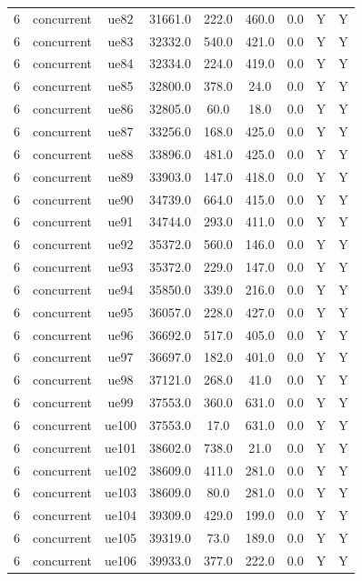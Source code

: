 \begin{table}[ht]
\begin{tabular}{|c|c|c|c|c|c|c|c|c|}
6 & concurrent & ue82 & 31661.0 & 222.0 & 460.0 & 0.0 & Y & Y \\
6 & concurrent & ue83 & 32332.0 & 540.0 & 421.0 & 0.0 & Y & Y \\
6 & concurrent & ue84 & 32334.0 & 224.0 & 419.0 & 0.0 & Y & Y \\
6 & concurrent & ue85 & 32800.0 & 378.0 & 24.0 & 0.0 & Y & Y \\
6 & concurrent & ue86 & 32805.0 & 60.0 & 18.0 & 0.0 & Y & Y \\
6 & concurrent & ue87 & 33256.0 & 168.0 & 425.0 & 0.0 & Y & Y \\
6 & concurrent & ue88 & 33896.0 & 481.0 & 425.0 & 0.0 & Y & Y \\
6 & concurrent & ue89 & 33903.0 & 147.0 & 418.0 & 0.0 & Y & Y \\
6 & concurrent & ue90 & 34739.0 & 664.0 & 415.0 & 0.0 & Y & Y \\
6 & concurrent & ue91 & 34744.0 & 293.0 & 411.0 & 0.0 & Y & Y \\
6 & concurrent & ue92 & 35372.0 & 560.0 & 146.0 & 0.0 & Y & Y \\
6 & concurrent & ue93 & 35372.0 & 229.0 & 147.0 & 0.0 & Y & Y \\
6 & concurrent & ue94 & 35850.0 & 339.0 & 216.0 & 0.0 & Y & Y \\
6 & concurrent & ue95 & 36057.0 & 228.0 & 427.0 & 0.0 & Y & Y \\
6 & concurrent & ue96 & 36692.0 & 517.0 & 405.0 & 0.0 & Y & Y \\
6 & concurrent & ue97 & 36697.0 & 182.0 & 401.0 & 0.0 & Y & Y \\
6 & concurrent & ue98 & 37121.0 & 268.0 & 41.0 & 0.0 & Y & Y \\
6 & concurrent & ue99 & 37553.0 & 360.0 & 631.0 & 0.0 & Y & Y \\
6 & concurrent & ue100 & 37553.0 & 17.0 & 631.0 & 0.0 & Y & Y \\
6 & concurrent & ue101 & 38602.0 & 738.0 & 21.0 & 0.0 & Y & Y \\
6 & concurrent & ue102 & 38609.0 & 411.0 & 281.0 & 0.0 & Y & Y \\
6 & concurrent & ue103 & 38609.0 & 80.0 & 281.0 & 0.0 & Y & Y \\
6 & concurrent & ue104 & 39309.0 & 429.0 & 199.0 & 0.0 & Y & Y \\
6 & concurrent & ue105 & 39319.0 & 73.0 & 189.0 & 0.0 & Y & Y \\
6 & concurrent & ue106 & 39933.0 & 377.0 & 222.0 & 0.0 & Y & Y \\

\end{tabular}
\end{table}
